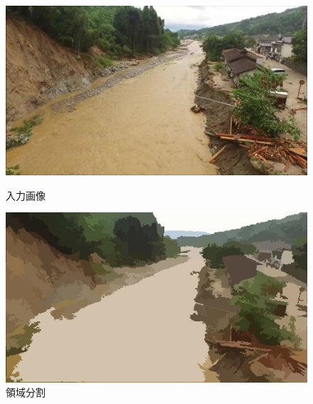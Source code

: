 \documentclass[a4paper, twocolumn, xelatex, 10pt, ja=standard, Ligatures=TeX]{bxjsarticle}
\begin{document}
		\begin{figure}[b]
			\begin{minipage}{0.48\hsize}
				\centering
				\includegraphics[width=\linewidth]{img/original.jpg}
				\caption{入力画像}
				\label{img01}
			\end{minipage}
			\begin{minipage}{0.48\hsize}
				\centering
				\includegraphics[width=\linewidth]{img/meanshift.jpg}
				\caption{領域分割}
				\label{img02}
			\end{minipage}
		\end{figure}
\end{document}
